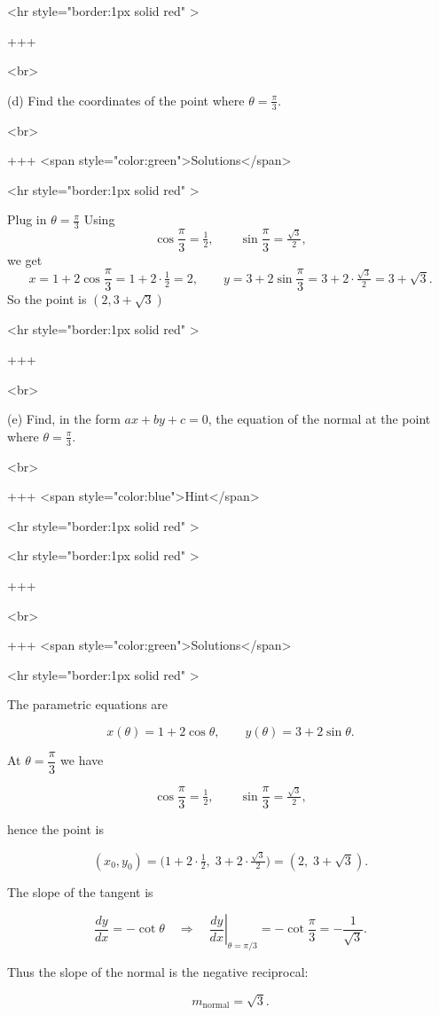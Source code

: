 <hr style="border:1px solid red" >

+++

<br>


(d) Find the coordinates of the point where $\theta=\frac{\pi}{3}$.

<br>

+++ <span style="color:green">Solutions</span>

<hr style="border:1px solid red" >

Plug in $\theta=\frac{\pi}{3}$ Using
$$
\cos\frac{\pi}{3}=\tfrac{1}{2},\qquad \sin\frac{\pi}{3}=\tfrac{\sqrt{3}}{2},
$$
we get
$$
x=1+2\cos\frac{\pi}{3}=1+2\cdot\tfrac{1}{2}=2,
\qquad
y=3+2\sin\frac{\pi}{3}=3+2\cdot\tfrac{\sqrt{3}}{2}=3+\sqrt{3}.
$$
So the point is $(2,3+\sqrt{3})$

<hr style="border:1px solid red" >

+++

<br>


(e) Find, in the form $a x+b y+c=0$, the equation of the normal at the point where $\theta=\frac{\pi}{3}$.

<br>

+++ <span style="color:blue">Hint</span>

<hr style="border:1px solid red" >

<hr style="border:1px solid red" >

+++

<br>

+++ <span style="color:green">Solutions</span>

<hr style="border:1px solid red" >

The parametric equations are

$$
x(\theta)=1+2\cos\theta,\qquad y(\theta)=3+2\sin\theta.
$$


At $\theta=\dfrac{\pi}{3}$ we have

$$
\cos\frac{\pi}{3}=\tfrac{1}{2},\qquad \sin\frac{\pi}{3}=\tfrac{\sqrt{3}}{2},
$$

hence the point is

$$
(x_0,y_0)=\bigl(1+2\cdot\tfrac{1}{2},\;3+2\cdot\tfrac{\sqrt{3}}{2}\bigr)=(2,\;3+\sqrt{3}).
$$


The slope of the tangent is

$$
\frac{dy}{dx}=-\cot\theta \quad\Rightarrow\quad
\left.\frac{dy}{dx}\right|_{\theta=\pi/3} = -\cot\frac{\pi}{3} = -\frac{1}{\sqrt{3}}.
$$

Thus the slope of the normal is the negative reciprocal:

$$
m_{\text{normal}}=\sqrt{3}.
$$



